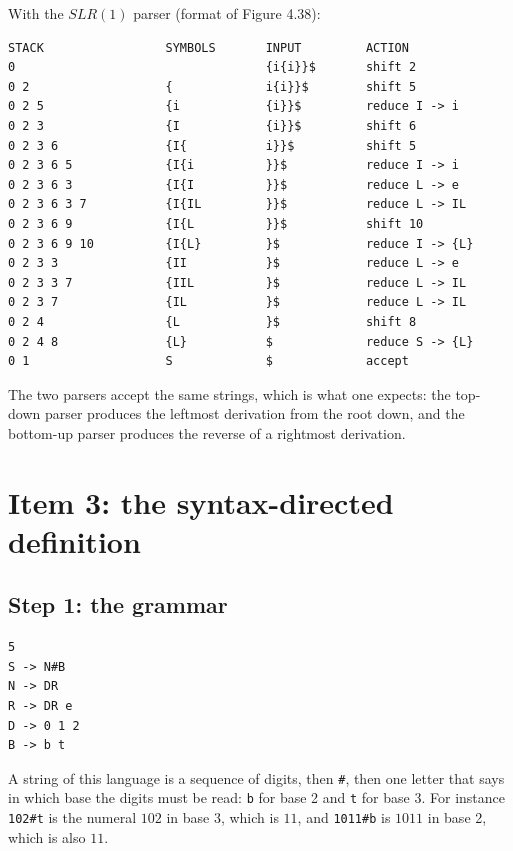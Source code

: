 \documentclass[11pt]{article}
\begin{document}
With the $SLR(1)$ parser (format of Figure 4.38):

\begin{center}
\small
\begin{verbatim}
STACK                 SYMBOLS       INPUT         ACTION
0                                   {i{i}}$       shift 2
0 2                   {             i{i}}$        shift 5
0 2 5                 {i            {i}}$         reduce I -> i
0 2 3                 {I            {i}}$         shift 6
0 2 3 6               {I{           i}}$          shift 5
0 2 3 6 5             {I{i          }}$           reduce I -> i
0 2 3 6 3             {I{I          }}$           reduce L -> e
0 2 3 6 3 7           {I{IL         }}$           reduce L -> IL
0 2 3 6 9             {I{L          }}$           shift 10
0 2 3 6 9 10          {I{L}         }$            reduce I -> {L}
0 2 3 3               {II           }$            reduce L -> e
0 2 3 3 7             {IIL          }$            reduce L -> IL
0 2 3 7               {IL           }$            reduce L -> IL
0 2 4                 {L            }$            shift 8
0 2 4 8               {L}           $             reduce S -> {L}
0 1                   S             $             accept
\end{verbatim}
\end{center}

The two parsers accept the same strings, which is what one expects: the top-down parser
produces the leftmost derivation from the root down, and the bottom-up parser produces
the reverse of a rightmost derivation.

\section{Item 3: the syntax-directed definition}

\subsection{Step 1: the grammar}

\begin{center}
\small
\begin{verbatim}
5
S -> N#B
N -> DR
R -> DR e
D -> 0 1 2
B -> b t
\end{verbatim}
\end{center}

A string of this language is a sequence of digits, then \texttt{\#}, then one letter that
says in which base the digits must be read: \texttt{b} for base 2 and \texttt{t} for base
3. For instance \texttt{102\#t} is the numeral $102$ in base 3, which is $11$, and
\texttt{1011\#b} is $1011$ in base 2, which is also $11$.
\end{document}
